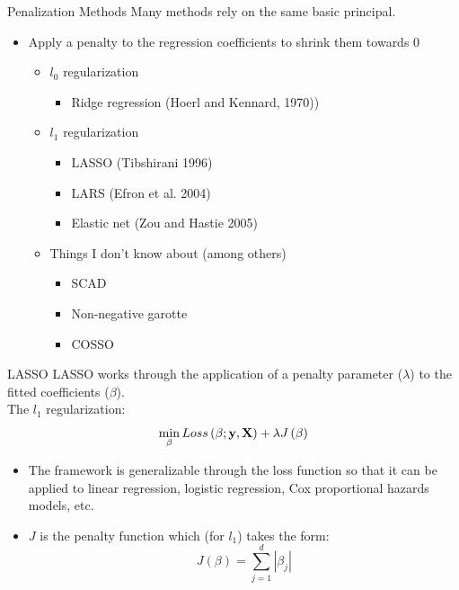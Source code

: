 \documentclass{beamer}\usepackage[]{graphicx}\usepackage[]{color}
\begin{document}
\begin{frame}{Penalization Methods}
Many methods rely on the same basic principal.
\bigskip
\begin{itemize}
\item Apply a penalty to the regression coefficients to shrink them towards 0
  \begin{itemize}
  \item $l_0$ regularization
    \begin{itemize}
    \item Ridge regression (Hoerl and Kennard, 1970))
    \end{itemize}
  \smallskip
  \pause
  \item $l_1$ regularization
    \begin{itemize}
    \item LASSO (Tibshirani 1996)
    \item LARS (Efron et al. 2004)
    \item Elastic net (Zou and Hastie 2005)
    \end{itemize}
  \smallskip
  \pause
  \item Things I don't know about (among others)
    \begin{itemize}
    \item SCAD
    \item Non-negative garotte
    \item COSSO
    \end{itemize}
  \end{itemize}
\end{itemize}
\end{frame}



\begin{frame}{LASSO}
LASSO works through the application of a penalty parameter ($\lambda$) to the fitted coefficients ($\beta$).\\
The $l_1$ regularization:
$$\min_\beta Loss\left(\beta; \bf{y,X} \right) + \lambda J\left(\beta\right)$$
\pause
\begin{itemize}
\item The framework is generalizable through the loss function so that it can be applied to linear regression, logistic regression, Cox proportional hazards models, etc.
\pause
\item $J$ is the penalty function which (for $l_1$) takes the form: $$J\left(\beta \right) = \sum_{j=1}^d |\beta_j|$$
\end{itemize}
\end{frame}
\end{document}
